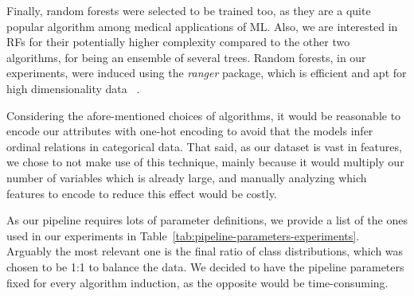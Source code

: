 Finally, random forests were selected to be trained too, as they are a quite popular algorithm among medical applications of ML\@.
Also, we are interested in RFs for their potentially higher complexity compared to the other two algorithms, for being an ensemble of several trees.
Random forests, in our experiments, were induced using the \textit{ranger} package, which is efficient and apt for high dimensionality data ~\cite{Wright2017}.

Considering the afore-mentioned choices of algorithms, it would be reasonable to encode our attributes with one-hot encoding to avoid that the models infer ordinal relations in categorical data.
That said, as our dataset is vast in features, we chose to not make use of this technique, mainly because it would multiply our number of variables which is already large, and manually analyzing which features to encode to reduce this effect would be costly.

As our pipeline requires lots of parameter definitions, we provide a list of the ones used in our experiments in Table~\ref{tab:pipeline-parameters-experiments}.
Arguably the most relevant one is the final ratio of class distributions, which was chosen to be 1:1 to balance the data.
We decided to have the pipeline parameters fixed for every algorithm induction, as the opposite would be time-consuming.

